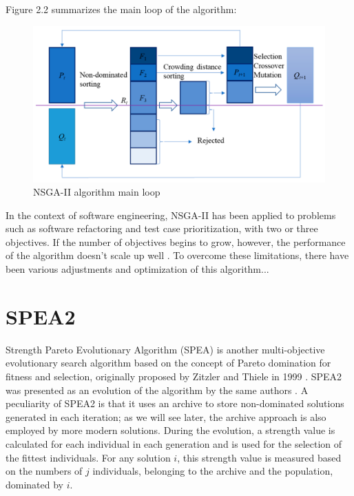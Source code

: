 Figure 2.2 summarizes the main loop of the algorithm:
\begin{figure}[!h]
    \centering
    \includegraphics[scale=0.1]{./figures/nsga-ii.png}
    \caption{NSGA-II algorithm main loop}
    \label{fig:NSGA-II algorithm main loop}
\end{figure}


In the context of software engineering, NSGA-II has been applied to problems such as software refactoring and test case prioritization,
with two or three objectives. If the number of objectives begins to grow, however, the performance of the algorithm doesn't scale up well \cite{DBLP:journals/csur/LiLTY15}.
To overcome these limitations, there have been various adjustments and optimization of this algorithm...





\newpage
\section{SPEA2}
Strength Pareto Evolutionary Algorithm (SPEA) is another multi-objective evolutionary search algorithm based on the concept of Pareto domination for fitness and selection, originally proposed by Zitzler and Thiele in 1999 \cite{DBLP:journals/tec/ZitzlerT99}. SPEA2 was presented as an evolution of the algorithm by the same authors \cite{DBLP:journals/tec/ZitzlerT01}.
A  peculiarity of SPEA2 is that it uses an archive to store non-dominated solutions generated in each iteration; as we will see later, the archive approach is also employed by more modern solutions.
\newline \newline
During the evolution, a strength value is calculated for each individual in each generation and is used for the selection of the fittest individuals. For any solution $ i $, this strength value is measured based on the numbers of $ j $ individuals, belonging to the archive and the population, dominated by $ i $.
\newline 

